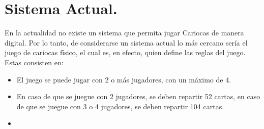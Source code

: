 \section{Sistema Actual.}\label{cap:sistemaActual}
En la actualidad no existe un sistema que permita jugar Cariocas de manera digital. Por lo tanto, de considerarse un sistema actual lo más cercano sería el juego de cariocas físico, el cual es, en efecto, quien define las reglas del juego. Estas consisten en:
\begin{itemize}
\item El juego se puede jugar con 2 o más jugadores, con un máximo de 4.
\item En caso de que se juegue con 2 jugadores, se deben repartir 52 cartas, en caso de que se juegue con 3 o 4 jugadores, se deben repartir 104 cartas.
\item 
\end{itemize}